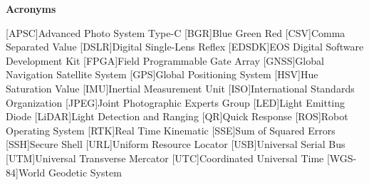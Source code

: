 
\vspace*{0.2cm}
\begin{center}
{\bf \Huge Acronyms}
\end{center}

\begin{acronym}[EDSDK12] %

\setlength{\parskip}{0ex}
\setlength{\itemsep}{0ex}

[APSC]{Advanced Photo System Type-C}
[BGR]{Blue Green Red}
[CSV]{Comma Separated Value}
[DSLR]{Digital Single-Lens Reflex}
[EDSDK]{EOS Digital Software Development Kit}
[FPGA]{Field Programmable Gate Array}
[GNSS]{Global Navigation Satellite System}
[GPS]{Global Positioning System}
[HSV]{Hue Saturation Value}
[IMU]{Inertial Measurement Unit}
[ISO]{International Standards Organization}
[JPEG]{Joint Photographic Experts Group}
[LED]{Light Emitting Diode}
[LiDAR]{Light Detection and Ranging}
[QR]{Quick Response}
[ROS]{Robot Operating System}
[RTK]{Real Time Kinematic}
[SSE]{Sum of Squared Errors}
[SSH]{Secure Shell}
[URL]{Uniform Resource Locator}
[USB]{Universal Serial Bus}
[UTM]{Universal Transverse Mercator}
[UTC]{Coordinated Universal Time}
[WGS-84]{World Geodetic System}

\end{acronym}




